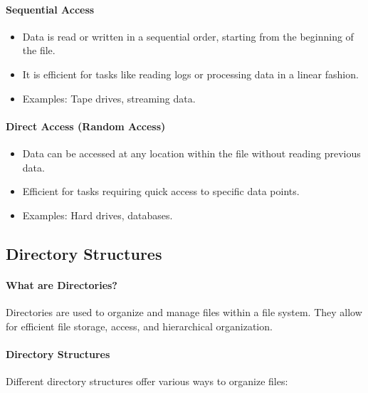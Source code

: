 \paragraph{Sequential Access}
\begin{itemize}
    \item Data is read or written in a sequential order, starting from the beginning of the file.
    \item It is efficient for tasks like reading logs or processing data in a linear fashion.
    \item Examples: Tape drives, streaming data.
\end{itemize}

\paragraph{Direct Access (Random Access)}
\begin{itemize}
    \item Data can be accessed at any location within the file without reading previous data.
    \item Efficient for tasks requiring quick access to specific data points.
    \item Examples: Hard drives, databases.
\end{itemize}



\subsection{Directory Structures}

\paragraph{What are Directories?}
Directories are used to organize and manage files within a file system. They allow for efficient file storage, access, and hierarchical organization.

\paragraph{Directory Structures}
Different directory structures offer various ways to organize files:

